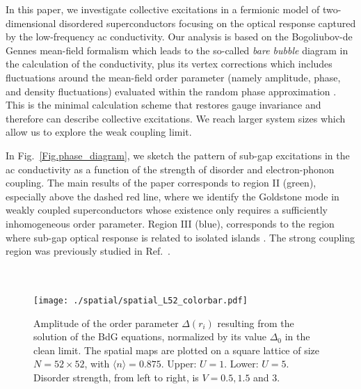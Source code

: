 \documentclass[Collective.tex]{revtex4-1}
\begin{document}
In this paper, we investigate collective excitations in a fermionic model of two-dimensional disordered superconductors focusing on the optical response captured by the low-frequency ac conductivity. Our analysis is based on the Bogoliubov-de Gennes mean-field formalism which leads to the so-called {\it bare bubble} diagram in the calculation of the conductivity, plus its vertex corrections \cite{schrieffer2018} which includes fluctuations around the mean-field order parameter (namely amplitude, phase, and density fluctuations) evaluated within the random phase approximation \cite{anderson1958sc,Supplementary}.
This is the minimal calculation scheme that restores gauge invariance and therefore can describe collective excitations. We reach larger system sizes which allow us to explore the weak coupling limit. 

In Fig.~\ref{Fig.phase_diagram}, we sketch the pattern of sub-gap excitations in the ac conductivity as a function of the strength of disorder and electron-phonon coupling. The main results of the paper corresponds to region II (green), especially above the dashed red line, where we identify the Goldstone mode in weakly coupled superconductors whose existence only requires a sufficiently inhomogeneous  \cite{ma1985,ghosal1998,Ghosal2001,mayoh2015global,bofan2020,bofan2020a,verdu2018,Burmistrov2012,Gastiasoro2018} order parameter. Region III (blue), corresponds to the region where sub-gap optical response is related to isolated islands \cite{cea2014}. The strong coupling region was previously studied in Ref.~\cite{cea2014}. \\
%
\begin{figure}
		\\
		\\
		\texttt{[image: ./spatial/spatial\_L52\_colorbar.pdf]}
		\caption{Amplitude of the order parameter $\Delta(r_i)$ resulting from the solution of the BdG equations, normalized by its value $\Delta_0$ in the clean limit. The spatial maps are plotted on a square lattice of size $N=52\times52$, with $\langle n \rangle =0.875$. Upper: $U=1$. Lower: $U=5$. Disorder strength, from left to right, is $V = 0.5, 1.5$ and $3$.} \label{Fig.spatial}
\end{figure}
\end{document}
